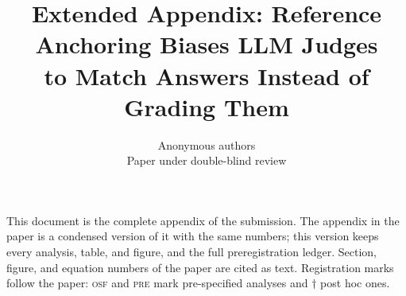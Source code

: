 \documentclass{article}
\title{Extended Appendix: Reference Anchoring Biases LLM Judges\\to Match Answers Instead of Grading Them}
\author{Anonymous authors\\Paper under double-blind review}
\begin{document}
\maketitle
\raggedbottom

\noindent This document is the complete appendix of the submission. The appendix in the paper is a condensed version of it with the same numbers; this version keeps every analysis, table, and figure, and the full preregistration ledger. Section, figure, and equation numbers of the paper are cited as text. Registration marks follow the paper: \textsc{osf} and \textsc{pre} mark pre-specified analyses and $\dagger$ post hoc ones.

\appendix
{}




\end{document}
